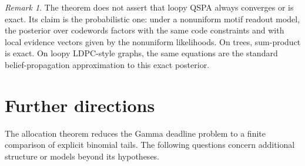 \documentclass[11pt]{article}
\theoremstyle{definition}
\theoremstyle{remark}
\newtheorem{remark}{Remark}
\newcommand{\1}{\mathbf 1}
\begin{document}
\begin{remark}
The theorem does not assert that loopy QSPA always converges or is exact.  Its claim is the probabilistic one: under a nonuniform motif readout model, the posterior over codewords factors with the same code constraints and with local evidence vectors given by the nonuniform likelihoods.  On trees, sum-product is exact.  On loopy LDPC-style graphs, the same equations are the standard belief-propagation approximation to this exact posterior.
\end{remark}

\section{Further directions}

The allocation theorem reduces the Gamma deadline problem to a finite comparison of explicit binomial tails. The following questions concern additional structure or models beyond its hypotheses.
\end{document}
